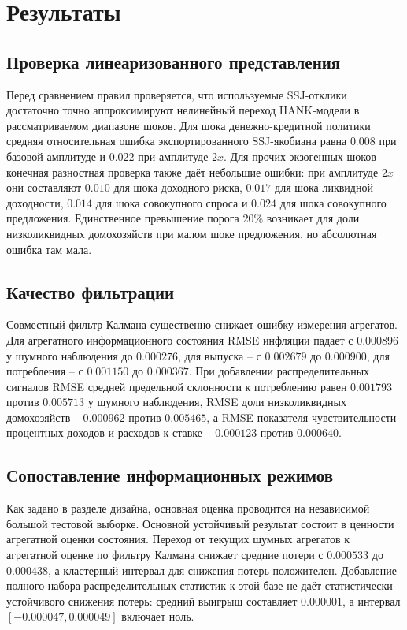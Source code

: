 \section{Результаты}

\subsection{Проверка линеаризованного представления}

Перед сравнением правил проверяется, что используемые SSJ-отклики достаточно точно
аппроксимируют нелинейный переход HANK-модели в рассматриваемом диапазоне шоков. Для шока
денежно-кредитной политики средняя относительная
ошибка экспортированного SSJ-якобиана равна \(0.008\) при базовой амплитуде и \(0.022\) при
амплитуде \(2x\). Для прочих экзогенных шоков конечная разностная проверка также даёт небольшие
ошибки: при амплитуде \(2x\) они составляют \(0.010\) для шока доходного риска, \(0.017\) для
шока ликвидной доходности, \(0.014\) для шока совокупного спроса и \(0.024\) для шока совокупного
предложения. Единственное превышение порога \(20\%\) возникает для доли низколиквидных
домохозяйств при малом шоке предложения, но абсолютная ошибка там мала.

\subsection{Качество фильтрации}

Совместный фильтр Калмана существенно снижает ошибку измерения агрегатов. Для агрегатного
информационного состояния RMSE инфляции падает с \(0.000896\) у шумного наблюдения до \(0.000276\),
для выпуска -- с \(0.002679\) до \(0.000900\), для потребления -- с \(0.001150\) до \(0.000367\).
При добавлении распределительных сигналов RMSE средней предельной склонности к потреблению равен
\(0.001793\) против \(0.005713\) у шумного наблюдения, RMSE доли низколиквидных домохозяйств --
\(0.000962\) против \(0.005465\), а RMSE показателя чувствительности процентных доходов и расходов
к ставке -- \(0.000123\) против \(0.000640\).

\subsection{Сопоставление информационных режимов}

Как задано в разделе дизайна, основная оценка проводится на независимой большой тестовой
выборке. Основной устойчивый результат состоит в ценности агрегатной оценки состояния. Переход от
текущих шумных агрегатов к агрегатной оценке по фильтру Калмана снижает средние потери с
\(0.000533\) до \(0.000438\), а кластерный интервал для снижения потерь положителен. Добавление
полного набора распределительных статистик к этой базе не даёт статистически устойчивого
снижения потерь: средний выигрыш составляет \(0.000001\), а интервал
\([-0.000047,0.000049]\) включает ноль.

